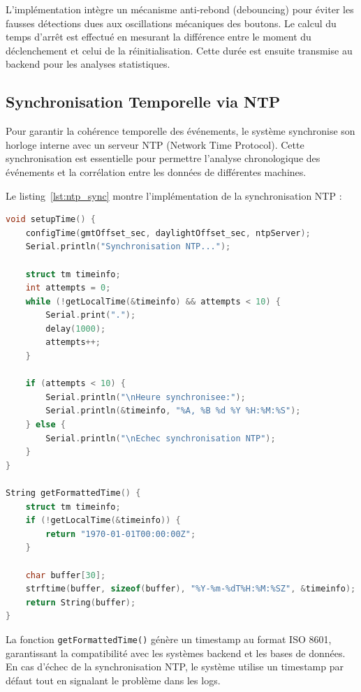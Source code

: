 L'implémentation intègre un mécanisme anti-rebond (debouncing) pour éviter les fausses détections dues aux oscillations mécaniques des boutons. Le calcul du temps d'arrêt est effectué en mesurant la différence entre le moment du déclenchement et celui de la réinitialisation. Cette durée est ensuite transmise au backend pour les analyses statistiques.

\subsection{Synchronisation Temporelle via NTP}
\label{subsec:impl_ntp}

Pour garantir la cohérence temporelle des événements, le système synchronise son horloge interne avec un serveur NTP (Network Time Protocol). Cette synchronisation est essentielle pour permettre l'analyse chronologique des événements et la corrélation entre les données de différentes machines.

Le listing~\ref{lst:ntp_sync} montre l'implémentation de la synchronisation NTP :

\begin{lstlisting}[language=C++, caption={Synchronisation de l'horloge système avec NTP}, label={lst:ntp_sync}, captionpos=b]
void setupTime() {
    configTime(gmtOffset_sec, daylightOffset_sec, ntpServer);
    Serial.println("Synchronisation NTP...");
    
    struct tm timeinfo;
    int attempts = 0;
    while (!getLocalTime(&timeinfo) && attempts < 10) {
        Serial.print(".");
        delay(1000);
        attempts++;
    }
    
    if (attempts < 10) {
        Serial.println("\nHeure synchronisee:");
        Serial.println(&timeinfo, "%A, %B %d %Y %H:%M:%S");
    } else {
        Serial.println("\nEchec synchronisation NTP");
    }
}

String getFormattedTime() {
    struct tm timeinfo;
    if (!getLocalTime(&timeinfo)) {
        return "1970-01-01T00:00:00Z";
    }
    
    char buffer[30];
    strftime(buffer, sizeof(buffer), "%Y-%m-%dT%H:%M:%SZ", &timeinfo);
    return String(buffer);
}
\end{lstlisting}

La fonction \texttt{getFormattedTime()} génère un timestamp au format ISO 8601, garantissant la compatibilité avec les systèmes backend et les bases de données. En cas d'échec de la synchronisation NTP, le système utilise un timestamp par défaut tout en signalant le problème dans les logs.


